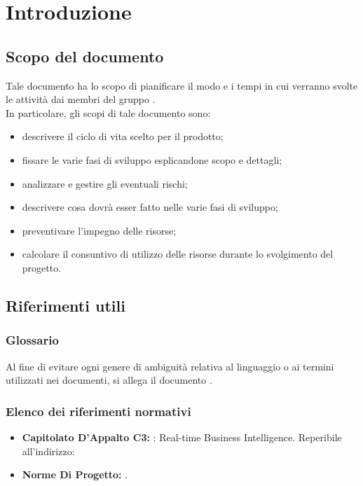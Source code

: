 \section{Introduzione}

	\subsection{Scopo del documento}
		Tale documento ha lo scopo di pianificare il modo e i tempi in cui verranno svolte le attività dai membri del gruppo \groupname{}.\\
		In particolare, gli scopi di tale documento sono:
		\begin{itemize}
			\item descrivere il ciclo di vita scelto per il prodotto;
			\item fissare le varie fasi di sviluppo esplicandone scopo e dettagli;
			\item analizzare e gestire gli eventuali rischi;
			\item descrivere cosa dovrà esser fatto nelle varie fasi di sviluppo;
			\item preventivare l'impegno delle risorse;
			\item calcolare il consuntivo di utilizzo delle risorse durante lo svolgimento del progetto.
		\end{itemize}
	
		

	\subsection{Riferimenti utili}
		\subsubsection{Glossario}
		Al fine di evitare ogni genere di ambiguità relativa al linguaggio o ai termini utilizzati nei documenti, si allega il documento .
		\subsubsection{Elenco dei riferimenti normativi}
			\begin{itemize}
				\item\textbf{Capitolato D'Appalto C3:} \projectname{}: Real-time Business Intelligence. Reperibile all'indirizzo: 
				\item\textbf{Norme Di Progetto:} .
			\end{itemize}
